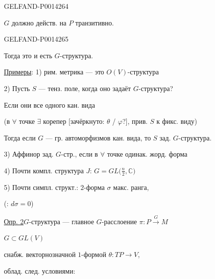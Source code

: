 \begin{GelfandAdjacentEvidence}{GELFAND-P001426}{4}


\(G\) должно действ. на \(P\) транзитивно.
\end{GelfandAdjacentEvidence}
\begin{GelfandAdjacentEvidence}{GELFAND-P001426}{5}


Тогда это и есть \(G\)-структура.

\uline{Примеры}: 1) рим. метрика — это \(O(V)\)-структура

2) Пусть \(S\) — тенз. поле, когда оно задаёт \(G\)-структура?

Если они все одного кан. вида

(в \(\forall\) точке \(\exists\) корепер
[зачёркнуто: \(\theta\) / \(\varphi\)?], прив. \(S\) к фикс. виду)
\end{GelfandAdjacentEvidence}


Тогда если \(G\) — гр. автоморфизмов кан. вида, то \(S\) зад. \(G\)-структура.

3) Аффинор зад. \(G\)-стр., если в \(\forall\) точке одинак. жорд. форма

4) Почти компл. структура \(J\): \(G=GL\bigl(\frac{n}{2},\mathbb C\bigr)\)

5) Почти симпл. структ.: \(2\)-форма \(\sigma\) макс. ранга,

(: \(d\sigma=0\))

\uline{Опр. 2}\quad \(G\)-структура — главное \(G\)-расслоение
\(\pi\colon P\overset{G}{\longrightarrow}M\)

\(G\subset GL(V)\)

снабж. векторнозначной \(1\)-формой \(\theta\colon TP\to V\),

облад. след. условиями:


